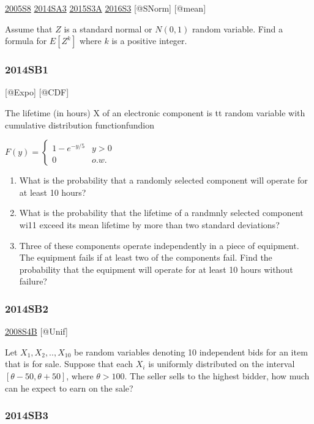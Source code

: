 \documentclass[6pt,twocolumn,Portrait]{article}
\begin{document}
\protect\hyperlink{s8-1}{2005S8} \protect\hyperlink{sa3-2}{2014SA3}
\protect\hyperlink{s3a-1}{2015S3A} \protect\hyperlink{s3-4}{2016S3}
{[}@SNorm{]} {[}@mean{]}

Assume that \(Z\) is a standard normal or \(N(0,1)\) random variable.
Find a formula for \(E[Z^k]\) where \(k\) is a positive integer.

\hypertarget{sb1-2}{%
\subsubsection{2014SB1}\label{sb1-2}}

{[}@Expo{]} {[}@CDF{]}

The lifetime (in hours) X of an electronic component is tt random
variable with cumulative distribution functionfundion

\(F(y)=\begin{cases}1-e^{-y/5}& y>0\\0& o.w.\end{cases}\)

\begin{enumerate}
\def\labelenumi{(\alph{enumi})}
\item
  What is the probability that a randomly selected component will
  operate for at least 10 hours?
\item
  What is the probability that the lifetime of a randmnly selected
  component wi11 exceed its mean lifetime by more than two standard
  deviations?
\item
  Three of these components operate independently in a piece of
  equipment. The equipment fails if at least two of the components fail.
  Find the probability that the equipment will operate for at least 10
  hours without failure?
\end{enumerate}

\hypertarget{sb2-2}{%
\subsubsection{2014SB2}\label{sb2-2}}

\protect\hyperlink{s4b}{2008S4B} {[}@Unif{]}

Let \(X_1,X_2,..,X_{10}\) be random variables denoting 10 independent
bids for an item that is for sale. Suppose that each \(X_i\) is
uniformly distributed on the interval \([\theta-50,\theta+50]\), where
\(\theta>100\). The seller sells to the highest bidder, how much can he
expect to earn on the sale?

\hypertarget{sb3-2}{%
\subsubsection{2014SB3}\label{sb3-2}}
\end{document}
